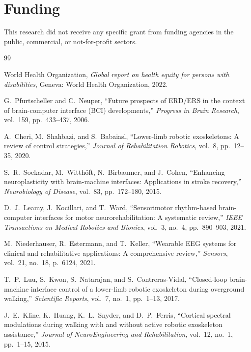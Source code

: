 \documentclass[11pt,a4paper]{article}
\begin{document}
\section*{Funding}
This research did not receive any specific grant from funding agencies in the public, commercial, or not-for-profit sectors.


\begin{thebibliography}{99}
\fontsize{10pt}{12.5pt}\selectfont

World Health Organization, \textit{Global report on health equity for persons with disabilities}, Geneva: World Health Organization, 2022.

G.~Pfurtscheller and C.~Neuper, ``Future prospects of ERD/ERS in the context of brain-computer interface (BCI) developments,'' \textit{Progress in Brain Research}, vol.~159, pp.~433--437, 2006.

A.~Cheri, M.~Shahbazi, and S.~Babaiasl, ``Lower-limb robotic exoskeletons: A review of control strategies,'' \textit{Journal of Rehabilitation Robotics}, vol.~8, pp.~12--35, 2020.

S.~R.~Soekadar, M.~Witth\"{o}ft, N.~Birbaumer, and J.~Cohen, ``Enhancing neuroplasticity with brain-machine interfaces: Applications in stroke recovery,'' \textit{Neurobiology of Disease}, vol.~83, pp.~172--180, 2015.

D.~J.~Leamy, J.~Kocillari, and T.~Ward, ``Sensorimotor rhythm-based brain-computer interfaces for motor neurorehabilitation: A systematic review,'' \textit{IEEE Transactions on Medical Robotics and Bionics}, vol.~3, no.~4, pp.~890--903, 2021.

M.~Niederhauser, R.~Estermann, and T.~Keller, ``Wearable EEG systems for clinical and rehabilitative applications: A comprehensive review,'' \textit{Sensors}, vol.~21, no.~18, p.~6124, 2021.

T.~P.~Luu, S.~Kwon, S.~Natarajan, and S.~Contreras-Vidal, ``Closed-loop brain-machine interface control of a lower-limb robotic exoskeleton during overground walking,'' \textit{Scientific Reports}, vol.~7, no.~1, pp.~1--13, 2017.

J.~E.~Kline, K.~Huang, K.~L.~Snyder, and D.~P.~Ferris, ``Cortical spectral modulations during walking with and without active robotic exoskeleton assistance,'' \textit{Journal of NeuroEngineering and Rehabilitation}, vol.~12, no.~1, pp.~1--15, 2015.


\end{thebibliography}
\end{document}
